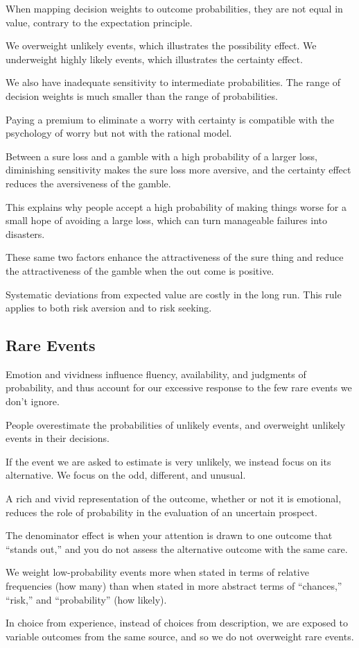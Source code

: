 \bit
\item When mapping decision weights to outcome probabilities, they are not equal in value, contrary to the
expectation principle.
\item We overweight unlikely events, which illustrates the possibility effect. We underweight highly likely events,
which illustrates the certainty effect.
\item We also have inadequate sensitivity to intermediate probabilities. The range of decision weights is much
smaller than the range of probabilities.
\item Paying a premium to eliminate a worry with certainty is compatible with the psychology of worry but not with
the rational model.
\item Between a sure loss and a gamble with a high probability of a larger loss, diminishing sensitivity makes the
sure loss more aversive, and the certainty effect reduces the aversiveness of the gamble.
\item This explains why people accept a high probability of making things worse for a small hope of avoiding a large
loss, which can turn manageable failures into disasters.
\item These same two factors enhance the attractiveness of the sure thing and reduce the attractiveness of the gamble
when the out come is positive.
\item Systematic deviations from expected value are costly in the long run. This rule applies to both risk aversion
and to risk seeking.
\eit

\subsection*{Rare Events}

\bit
\item Emotion and vividness influence fluency, availability, and judgments of probability, and thus account for our
excessive response to the few rare events we don't ignore.
\item People overestimate the probabilities of unlikely events, and overweight unlikely events in their decisions.
\item If the event we are asked to estimate is very unlikely, we instead focus on its alternative. We focus on the
odd, different, and unusual.
\item A rich and vivid representation of the outcome, whether or not it is emotional, reduces the role of probability
in the evaluation of an uncertain prospect.
\item The denominator effect is when your attention is drawn to one outcome that ``stands out,'' and you do not assess
the alternative outcome with the same care.
\item We weight low-probability events more when stated in terms of relative frequencies (how many) than when stated
in more abstract terms of ``chances,'' ``risk,'' and ``probability'' (how likely).
\item In choice from experience, instead of choices from description, we are exposed to variable outcomes from the
same source, and so we do not overweight rare events.
\eit

